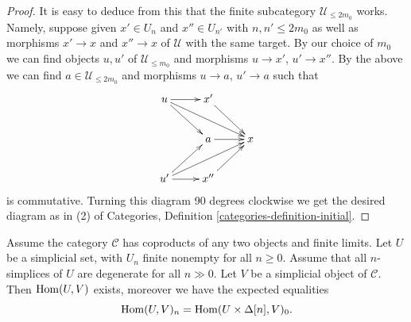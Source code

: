 \begin{proof}
\medskip\noindent
It is easy to deduce from this that the finite subcategory
$\mathcal{U}_{\leq 2m_0}$ works. Namely, suppose given
$x' \in U_n$ and $x'' \in U_{n'}$ with $n, n' \leq 2m_0$ as well as
morphisms $x' \to x$ and $x'' \to x$ of $\mathcal{U}$
with the same target. By our choice of $m_0$ we can
find objects $u, u'$ of $\mathcal{U}_{\leq m_0}$ and
morphisms $u \to x'$, $u' \to x''$.
By the above we can find $a \in \mathcal{U}_{\leq 2m_0}$
and morphisms $u \to a$, $u' \to a$ such that
$$
\xymatrix{
u \ar[rd] \ar[rrd] \ar[r] & x' \ar[rd] & \\
& a \ar[r] & x \\
u' \ar[ru] \ar[rru] \ar[r] & x'' \ar[ru] &
}
$$
is commutative. Turning this diagram 90 degrees clockwise
we get the desired diagram as in (2) of
Categories, Definition \ref{categories-definition-initial}.
\end{proof}

\begin{lemma}
\label{lemma-exists-hom-from-simplicial-set-finite}
Assume the category $\mathcal{C}$
has coproducts of any two objects and finite
limits. Let $U$ be a simplicial set, with $U_n$ finite nonempty
for all $n \geq 0$. Assume that all $n$-simplices
of $U$ are degenerate for all $n \gg 0$.
Let $V$ be a simplicial object of $\mathcal{C}$.
Then $\mathop{\mathrm{Hom}}\nolimits(U, V)$ exists, moreover
we have the expected equalities
$$
\mathop{\mathrm{Hom}}\nolimits(U, V)_n = \mathop{\mathrm{Hom}}\nolimits(U \times \Delta[n], V)_0.
$$
\end{lemma}

